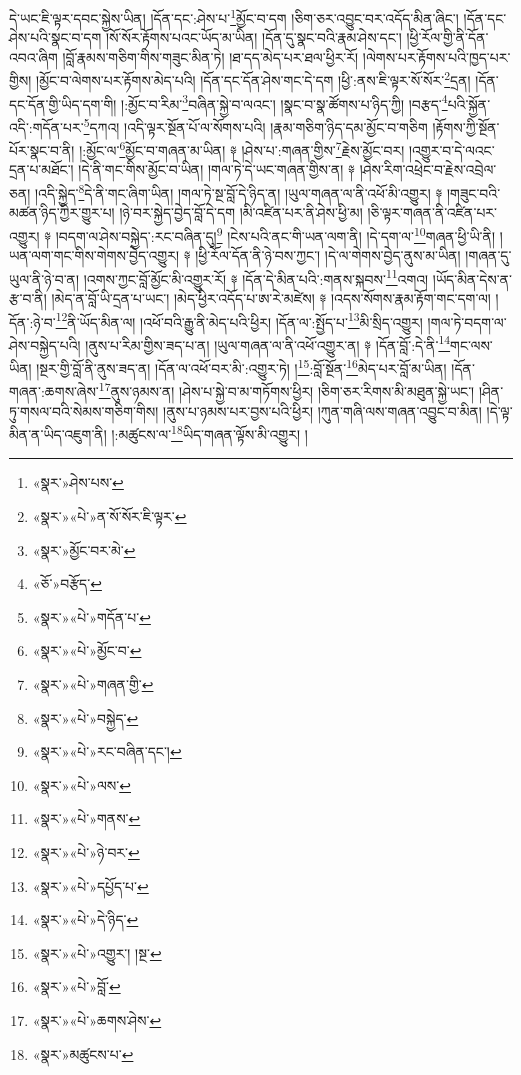 དེ་ཡང་ཇི་ལྟར་དབང་སྐྱེས་ཡིན། །དོན་དང་:ཤེས་པ་\footnote{«སྣར་»ཤེས་པས་}མྱོང་བ་དག །ཅིག་ཅར་འབྱུང་བར་འདོད་མིན་ཞིང་། །དོན་དང་ཤེས་པའི་སྣང་བ་དག །སོ་སོར་རྟོགས་པའང་ཡོད་མ་ཡིན། །དོན་དུ་སྣང་བའི་རྣམ་ཤེས་དང་། །ཕྱི་རོལ་གྱི་ནི་དོན་འབའ་ཞིག །བློ་རྣམས་གཅིག་གིས་གཟུང་མིན་ཏེ། །ཐ་དད་མེད་པར་ཐལ་ཕྱིར་རོ། །ལེགས་པར་རྟོགས་པའི་ཁྱད་པར་གྱིས། །མྱོང་བ་ལེགས་པར་རྟོགས་མེད་པའི། །དོན་དང་དོན་ཤེས་གང་དེ་དག །ཕྱི་:ནས་ཇི་ལྟར་སོ་སོར་\footnote{«སྣར་»«པེ་»ན་སོ་སོར་ཇི་ལྟར་}དྲན། །དོན་དང་དོན་གྱི་ཡིད་དག་གི། །:མྱོང་བ་རིམ་\footnote{«སྣར་»མྱོང་བར་མེ་}བཞིན་སྐྱེ་བ་ལའང་། །སྣང་བ་སྣ་ཚོགས་པ་ཉིད་ཀྱི། །བརྩད་\footnote{«ཅོ་»བརྩོད་}པའི་སྐྱོན་འདི་:གདོན་པར་\footnote{«སྣར་»«པེ་»གདོན་པ་}དཀའ། །འདི་ལྟར་སྔོན་པོ་ལ་སོགས་པའི། །རྣམ་གཅིག་ཉིད་དམ་མྱོང་བ་གཅིག །རྟོགས་ཀྱི་སྔོན་པོར་སྣང་བ་ནི། །:མྱོང་ལ་\footnote{«སྣར་»«པེ་»མྱོང་བ་}མྱོང་བ་གཞན་མ་ཡིན། ༈ །ཤེས་པ་:གཞན་གྱིས་\footnote{«སྣར་»«པེ་»གཞན་གྱི་}རྗེས་མྱོང་བར། །འགྱུར་བ་དེ་ལའང་དྲན་པ་མཐོང་། །དེ་ནི་གང་གིས་མྱོང་བ་ཡིན། །གལ་ཏེ་དེ་ཡང་གཞན་གྱིས་ན། ༈ །ཤེས་རིག་འཕྲེང་བ་རྗེས་འབྲེལ་ཅན། །འདི་སྐྱེད་\footnote{«སྣར་»«པེ་»བསྐྱེད་}དེ་ནི་གང་ཞིག་ཡིན། །གལ་ཏེ་སྔ་བློ་དེ་ཉིད་ན། །ཡུལ་གཞན་ལ་ནི་འཕོ་མི་འགྱུར། ༈ །གཟུང་བའི་མཚན་ཉིད་ཀྱིར་གྱུར་པ། །ཉེ་བར་སྐྱེད་བྱེད་བློ་དེ་དག །མི་འཛིན་པར་ནི་ཤེས་ཕྱི་མ། །ཅི་ལྟར་གཞན་ནི་འཛིན་པར་འགྱུར། ༈ །བདག་ལ་ཤེས་བསྐྱེད་:རང་བཞིན་དུ།\footnote{«སྣར་»«པེ་»རང་བཞིན་དང་།} །ངེས་པའི་ནང་གི་ཡན་ལག་ནི། །དེ་དག་ལ་\footnote{«སྣར་»«པེ་»ལས་}གཞན་ཕྱི་ཡི་ནི། །ཡན་ལག་གང་གིས་གེགས་བྱེད་འགྱུར། ༈ །ཕྱི་རོལ་དོན་ནི་ཉེ་བས་ཀྱང་། །དེ་ལ་གེགས་བྱེད་ནུས་མ་ཡིན། །གཞན་དུ་ཡུལ་ནི་ཉེ་བ་ན། །འགས་ཀྱང་བློ་མྱོང་མི་འགྱུར་རོ། ༈ །དོན་དེ་མིན་པའི་:གནས་སྐབས་\footnote{«སྣར་»«པེ་»གནས་}འགའ། །ཡོད་མིན་དེས་ན་རྩ་བ་ནི། །མེད་ན་བློ་ཡི་དྲན་པ་ཡང་། །མེད་ཕྱིར་འདོད་པ་ཨ་རེ་མཛེས། ༈ །འདས་སོགས་རྣམ་རྟོག་གང་དག་ལ། །དོན་:ཉེ་བ་\footnote{«སྣར་»«པེ་»ཉེ་བར་}ནི་ཡོད་མིན་ལ། །འཕོ་བའི་རྒྱུ་ནི་མེད་པའི་ཕྱིར། །དོན་ལ་:སྤྱོད་པ་\footnote{«སྣར་»«པེ་»དཔྱོད་པ་}མི་སྲིད་འགྱུར། །གལ་ཏེ་བདག་ལ་ཤེས་བསྐྱེད་པའི། །ནུས་པ་རིམ་གྱིས་ཟད་པ་ན། །ཡུལ་གཞན་ལ་ནི་འཕོ་འགྱུར་ན། ༈ །དོན་བློ་:དེ་ནི་\footnote{«སྣར་»«པེ་»དེ་ཉིད་}གང་ལས་ཡིན། །སྔར་གྱི་བློ་ནི་ནུས་ཟད་ན། །དོན་ལ་འཕོ་བར་མི་:འགྱུར་ཏེ། །\footnote{«སྣར་»«པེ་»འགྱུར་། །སྔ་}:བློ་སྔོན་\footnote{«སྣར་»«པེ་»བློ་}མེད་པར་བློ་མ་ཡིན། །དོན་གཞན་:ཆགས་ཞེས་\footnote{«སྣར་»«པེ་»ཆགས་ཤེས་}ནུས་ཉམས་ན། །ཤེས་པ་སྐྱེ་བ་མ་གཏོགས་ཕྱིར། །ཅིག་ཅར་རིགས་མི་མཐུན་སྐྱེ་ཡང་། །ཤིན་ཏུ་གསལ་བའི་སེམས་གཅིག་གིས། །ནུས་པ་ཉམས་པར་བྱས་པའི་ཕྱིར། །ཀུན་གཞི་ལས་གཞན་འབྱུང་བ་མིན། །དེ་ལྟ་མིན་ན་ཡིད་འཇུག་ནི། །:མཚུངས་ལ་\footnote{«སྣར་»མཚུངས་པ་}ཡིད་གཞན་ལྟོས་མི་འགྱུར། །
